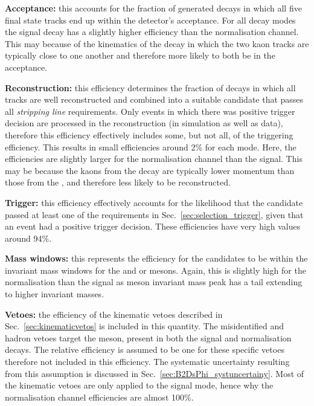 \begin{description}

\item \textbf{Acceptance:} this accounts for the fraction of generated decays in which all five final state tracks end up within the \lhcb detector's acceptance. For all \Dsp decay modes the signal decay has a slightly higher efficiency than the normalisation channel. This may because of the kinematics of the \decay{\phiz}{\Kp\Km} decay in which the two kaon tracks are typically close to one another and therefore more likely to both be in the acceptance.   

\item \textbf{Reconstruction:} this efficiency determines the fraction of decays in which all tracks are well reconstructed and combined into a suitable candidate that passes all \emph{stripping line} requirements. 
Only events in which there was positive trigger decision are processed in the reconstruction (in simulation as well as data), therefore this efficiency effectively includes some, but not all, of the triggering efficiency.
This results in small efficiencies around 2\% for each mode. Here, the efficiencies are slightly larger for the normalisation channel than the signal. This may be because the kaons from the \phiz decay are typically lower momentum than those from the \Dzb, and therefore less likely to be reconstructed.  

\item \textbf{Trigger:} this efficiency effectively accounts for the likelihood that the candidate passed at least one of the requirements in Sec.~\ref{sec:selection_trigger}, given that an event had a positive trigger decision. These efficiencies have very high values around 94\%.  

\item \textbf{Mass windows:} this represents the efficiency for the candidates to be within the invariant mass windows for the \Dsp and \phiz or \Dzb mesons. Again, this is slightly high for the normalisation than the signal as \phiz meson invariant mass peak has a tail extending to higher invariant masses.  

\item \textbf{Vetoes:} the efficiency of the kinematic vetoes described in Sec.~\ref{sec:kinematicvetos} is included in this quantity. The misidentified \D and \Lc hadron vetoes target the \Dsp meson, present in both the signal and normalisation decays. The relative efficiency is assumed to be one for these specific vetoes therefore not included in this efficiency. The systematic uncertainty resulting from this assumption is discussed in Sec.~\ref{sec:B2DsPhi_systuncertainy}. Most of the kinematic vetoes are only applied to the signal mode, hence why the normalisation channel efficiencies are almost 100\%.


\end{description}
